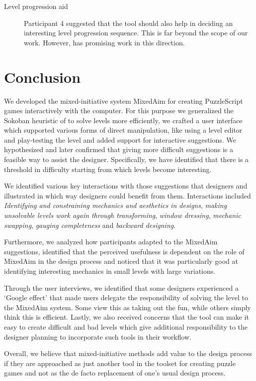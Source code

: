 \begin{description}
     \item[Level progression aid] Participant 4 suggested that the tool should also help in deciding an interesting level progression sequence. This is far beyond the scope of our work. However, \cite{Butler2013} has promising work in this direction. 
    
\end{description}

\section{Conclusion}

We developed the mixed-initiative system MixedAim for creating PuzzleScript games interactively with the computer. For this purpose we generalized the Sokoban heuristic of \cite{Jurgen} to solve levels more efficiently, we crafted a user interface which supported various forms of direct manipulation, like using a level editor and play-testing the level and added support for interactive suggestions. We hypothesized and later confirmed that giving more difficult suggestions is a feasible way to assist the designer. Specifically, we have identified that there is a threshold in difficulty starting from which levels become interesting.

We identified various key interactions with those suggestions that designers and illustrated in which way designers could benefit from them. Interactions included \textit{Identifying and constraining mechanics and aesthetics in designs}, \textit{making unsolvable levels work again through transforming},  \textit{window dressing}, \textit{mechanic swapping}, \textit{gauging completeness} and \textit{backward designing}.

Furthermore, we analyzed how participants adapted to the MixedAim suggestions, identified that the perceived usefulness is dependent on the role of MixedAim in the design process and noticed that it was particularly good at identifying interesting mechanics in small levels with large variations.

Through the user interviews, we identified that some designers experienced a `Google effect' that made users delegate the responsibility of solving the level to the MixedAim system. Some view this as taking out the fun, while others simply think this is efficient. Lastly, we also received concerns that the tool can make it easy to create difficult and bad levels which give additional responsibility to the designer planning to incorporate such tools in their workflow.

Overall, we believe that mixed-initiative methods add value to the design process if they are approached as just another tool in the toolset for creating puzzle games and not as the de facto replacement of one's usual design process.
